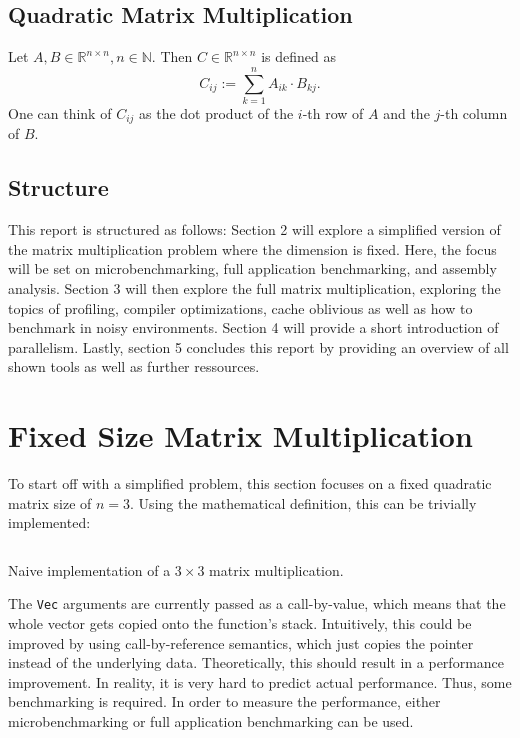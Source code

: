 \subsection{Quadratic Matrix Multiplication}

Let $A, B \in \mathbb{R}^{n\times n}, n \in \mathbb{N}$. Then $C \in \mathbb{R}^{n \times n}$ is defined as
\[
  C_{ij} := \sum_{k=1}^n A_{ik} \cdot B_{kj}.
\]
One can think of $C_{ij}$ as the dot product of the $i$-th row of $A$ and the $j$-th column of $B$.

\subsection{Structure}
This report is structured as follows: Section 2 will explore a simplified version of the matrix multiplication problem where the dimension is fixed. Here, the focus will be set on microbenchmarking, full application benchmarking, and assembly analysis. Section 3 will then explore the full matrix multiplication, exploring the topics of profiling, compiler optimizations, cache oblivious as well as how to benchmark in noisy environments. Section 4 will provide a short introduction of parallelism. Lastly, section 5 concludes this report by providing an overview of all shown tools as well as further ressources.

\section{Fixed Size Matrix Multiplication}
To start off with a simplified problem, this section focuses on a fixed quadratic matrix size of $n=3$. Using the mathematical definition, this can be trivially implemented:

\begin{listing}[H]
  \inputminted{rust}{./assets/first_impl.rs}
\caption{Naive implementation of a $3\times3$ matrix multiplication.}
\label{lst:hello}
\end{listing}

The \texttt{Vec} arguments are currently passed as a call-by-value, which means that the whole vector gets copied onto the function's stack. Intuitively, this could be improved by using call-by-reference semantics, which just copies the pointer instead of the underlying data. Theoretically, this should result in a performance improvement. In reality, it is very hard to predict actual performance. Thus, some benchmarking is required. In order to measure the performance, either microbenchmarking or full application benchmarking can be used.

